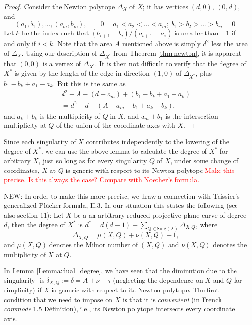 \documentclass[oneside]{amsart}
\theoremstyle{definition}
\newcommand{\nathan}[1]{\textcolor{red}{#1}}
\newcommand{\bernd}[1]{\textcolor{green!60!black}{#1}}
\begin{document}
\begin{proof}
Consider the Newton polytope $\Delta_X$ of $X$; it has vertices $(d,0)$, $(0,d)$, and 
\[(a_1,b_1),\ldots, (a_m,b_m), \qquad 0=a_1<a_2<\ldots <a_m;\ b_1>b_2>\ldots>b_m=0.
\]
Let $k$ be the index such that $(b_{i+1}-b_i)/(a_{i+1}-a_i)$ is smaller than $-1$ if and only if $i<k$.  Note that the area $A$ mentioned above is simply $d^2$ less the area of $\Delta_X$. Using our description of $\Delta_{X^*}$ from Theorem \ref{thm:newton}, it is apparent that $(0,0)$ is a vertex of $\Delta_{X^*}$. It is then not difficult to verify that the degree of $X^*$ is given by the length of the edge in direction $(1,0)$ of $\Delta_{X^*}$, plus $b_1-b_k+a_1-a_k$.
But this is the same as 
\begin{align*}
d^2-A-(d-a_m)+(b_1-b_k+a_1-a_k)\\
=d^2-d-(A-a_m-b_1+a_k+b_k),
\end{align*}
and $a_k+b_k$ is the multiplicity of $Q$ in $X$, and $a_m+b_1$ is the intersection multiplicity at $Q$ of the union of the coordinate axes with $X$.
\end{proof}

Since each singularity of $X$ contributes independently to the lowering of the degree of $X^*$, we can use the above lemma to calculate the degree of $X^*$ for arbitrary $X$, just so long as for every singularity $Q$ of $X$, under some change of coordinates, $X$ at $Q$ is generic with respect to its Newton polytope \nathan{Make this precise. Is this always the case? Compare with Noether's formula.}

\smallskip

\bernd{NEW:}
In order to make this more precise, we draw a connection with 
Teissier's generalized Pl\"ucker formula, \cite{LNM777} II.3.
In our situation this states the following 
(see also \cite{Teissier_Trieste} section 11):
Let $ X $ be a an arbitrary reduced projective plane curve of degree $ d $,
then the degree of $ X^* $ is 
$ d^* = d ( d - 1) - \sum\limits_{Q \in \mathrm{Sing}(X) } \Delta_{X,Q} $, where
$$
	\Delta_{X,Q} = \mu(X,Q) + \nu(X,Q) - 1 ,
$$
and $ \mu(X,Q) $ denotes the Milnor number of $ (X,Q) $ and 
$ \nu(X,Q) $ denotes the multiplicity of $ X $ at $ Q $. 

In Lemma \ref{Lemma:dual_degree}, we have seen that the diminution due to
the singularity $  $ is $ \delta_{X,Q} := \delta = A + \nu - \tau $ 
(neglecting the dependence on $ X $ and $ Q $ for simplicity)
if $ X $ is generic with respect to its Newton polytope.
The first condition that we need to impose on $ X $ is that it is {\em convenient}
(in French {\em commode} \cite{Kouchnirenko} 1.5 D\'efinition), 
i.e., its Newton polytope intersects every coordinate axis.
\end{document}

